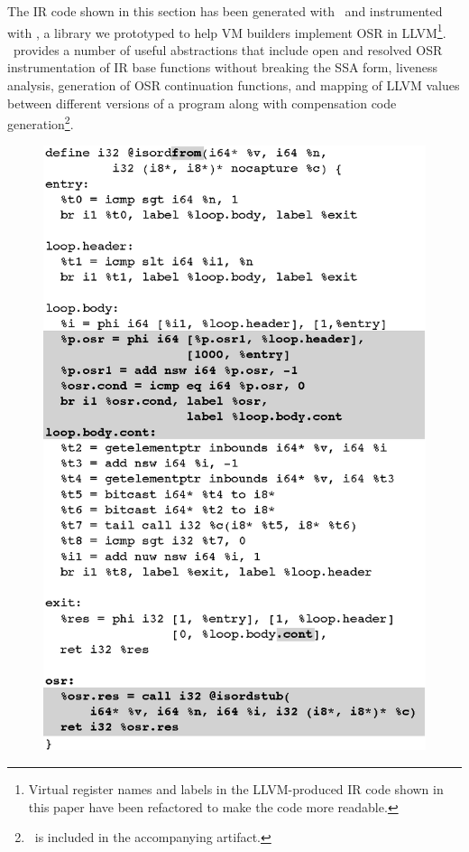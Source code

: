 The IR code shown in this section has been generated with \clang\ and instrumented with \osrkit, a library we prototyped to help VM builders implement OSR in LLVM\footnote{Virtual register names and labels in the LLVM-produced IR code shown in this paper have been refactored to make the code more readable.}. \osrkit\ provides a number of useful abstractions that include open and resolved OSR instrumentation of IR base functions without breaking the SSA form, liveness analysis, generation of OSR continuation functions, and mapping of LLVM values between different versions of a program along with compensation code generation\footnote{\osrkit\ is included in the accompanying artifact.}.


\ifdefined\noauthorea
\begin{figure}[t]
\begin{center}
\includegraphics[width=0.9\columnwidth]{figures/isordfrom/isordfrom.eps}
\caption{\protect}
\end{center}
\end{figure}
\fi

